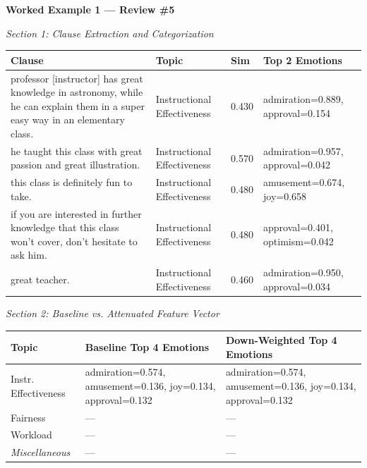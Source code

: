 \documentclass{article}
\begin{document}
\thispagestyle{empty}

\noindent\textbf{Worked Example 1 — Review \#5} 

\vspace{0.5em}
\noindent\textit{Section 1: Clause Extraction and Categorization}

\vspace{0.3em}
\noindent
\begin{tabular}{p{7cm} p{3.5cm} p{1cm} p{5.5cm}}
\toprule
\textbf{Clause} & \textbf{Topic} & \textbf{Sim} & \textbf{Top 2 Emotions} \\
\midrule
professor [instructor] has great knowledge in astronomy, while he can explain them in a super easy way in an elementary class. & Instructional Effectiveness & 0.430 & admiration=0.889, approval=0.154 \\
\addlinespace
he taught this class with great passion and great illustration. & Instructional Effectiveness & 0.570 & admiration=0.957, approval=0.042 \\
\addlinespace
this class is definitely fun to take. & Instructional Effectiveness & 0.480 & amusement=0.674, joy=0.658 \\
\addlinespace
if you are interested in further knowledge that this class won't cover, don't hesitate to ask him. & Instructional Effectiveness & 0.480 & approval=0.401, optimism=0.042 \\
\addlinespace
great teacher. & Instructional Effectiveness & 0.460 & admiration=0.950, approval=0.034 \\
\bottomrule
\end{tabular}

\vspace{0.8em}
\noindent\textit{Section 2: Baseline vs. Attenuated Feature Vector}

\vspace{0.3em}
\noindent
\begin{tabular}{p{3.5cm} p{7cm} p{7cm}}
\toprule
\textbf{Topic} & \textbf{Baseline Top 4 Emotions} & \textbf{Down-Weighted Top 4 Emotions}  \\
\midrule
Instr. Effectiveness & admiration=0.574, amusement=0.136, joy=0.134, approval=0.132 & admiration=0.574, amusement=0.136, joy=0.134, approval=0.132 \\
\addlinespace
Fairness & — & — \\
\addlinespace
Workload & — & — \\
\addlinespace
\textit{Miscellaneous} & — & — \\
\bottomrule
\end{tabular}
\end{document}
